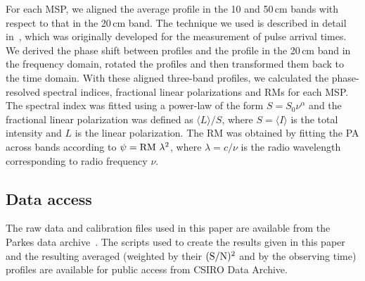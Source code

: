 \documentclass[useAMS,usenatbib]{mn2e}
\begin{document}

For each MSP, we aligned the average profile in the 10 and 50\,cm bands with 
respect to that in the 20\,cm band.
%
The technique we used is described in detail in~\citet{Taylor92}, which 
was originally developed for the measurement of pulse arrival times.
%
We derived the phase shift between profiles and the profile in the 20\,cm band 
in the frequency domain, rotated the profiles and then transformed them back to 
the time domain.
%
With these aligned three-band profiles, we calculated the phase-resolved 
spectral indices, fractional linear polarizations and RMs for each MSP. 
The spectral index was fitted using a power-law of the form $S=S_{0}\nu^{\alpha}$ 
and the fractional linear polarization was defined as $\langle L \rangle/S$, 
where $S=\langle I\rangle$ is the total intensity and $L$ is the linear polarization.
%
The RM was obtained by fitting the PA across bands according to $\psi=\rm{RM}\ \lambda^{2}$,
where $\lambda=c/\nu$ is the radio wavelength corresponding to radio 
frequency $\nu$.
%



%
%

\subsection{Data access}

The raw data and calibration files used in this paper are available from the 
Parkes data archive~\citep[][data.csiro.au]{Hobbs11}.  
%
The scripts used to create the results given in this paper and the resulting averaged 
(weighted by their $(\rm{S/N})^2$ and by the observing time) profiles are available for 
public access from CSIRO Data Archive.
\end{document}
